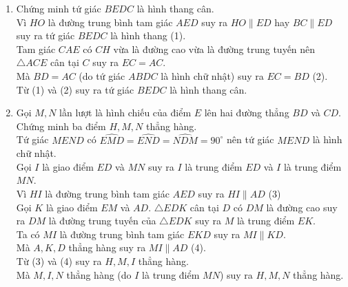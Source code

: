 \begin{bt}
{\begin{enumerate}
	suy ra $HO=\dfrac{1}{2}ED$ hay $ED=2HO$.
	\item Chứng minh tứ giác $BEDC$ là hình thang cân.\\
	Vì $HO$ là đường trung bình tam giác $AED$ suy ra $HO \parallel ED$ hay $BC \parallel ED$ suy ra tứ giác $BEDC$ là hình thang \hfill (1).\\
	Tam giác $CAE$ có $CH$ vừa là đường cao vừa là đường trung tuyến nên  $\triangle ACE$ cân tại $C$
	suy ra $EC = AC$.\\
	Mà $BD = AC$ (do tứ giác $ABDC$ là hình chữ nhật) suy ra  $EC = BD$ \hfill (2).\\
	Từ (1) và (2) suy ra tứ giác $BEDC$ là hình thang cân.
	\item Gọi $M, N$ lần lượt là hình chiếu của điểm $E$ lên hai đường thẳng $BD$ và $CD$. Chứng minh ba điểm  $H, M, N$ thẳng hàng. \\
	Tứ giác $MEND$ có $\widehat{EMD}=\widehat{END}=\widehat{NDM}=90^\circ$ nên tứ giác $MEND$ là hình chữ nhật.\\
	Gọi $I$  là giao điểm $ED$ và $MN$
	suy ra $I$ là trung điểm $ED$ và $I$ là trung điểm $MN$.\\
	Vì $HI$ là đường trung bình tam giác $AED$ suy ra $HI \parallel AD$ \hfill (3)\\
	Gọi $K$  là giao điểm $EM$ và $AD$. $\triangle EDK$ cân tại $D$ có $DM$ là đường cao suy ra $DM$ là đường trung tuyến của $\triangle EDK$ suy ra $M$ là trung điểm $EK$.\\ 
	Ta có $MI$ là đường trung bình tam giác $EKD$
	suy ra $MI \parallel KD$.\\
	Mà $A, K, D$ thẳng hàng
	suy ra $MI \parallel AD$ \hfill (4).\\
	Từ (3) và (4) suy ra $H , M, I$ thẳng hàng.\\
	Mà $M , I, N$ thẳng hàng (do $I$ là trung điểm $MN$)
	suy ra $H , M, N$ thẳng hàng.
\end{enumerate}	
	}
\end{bt}

